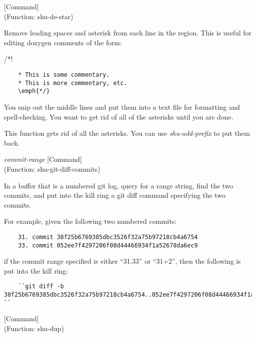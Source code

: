 \vspace{1em}
\noindent
{}
\usebox{\funcname}
 \hfill [Command]\\%
 (Function: shu-de-star)

\begin{doc-string}
Remove leading spaces and asterisk from each line in the region.  This is
useful for editing doxygen comments of the form:

   /*!
\small{\begin{verbatim}
    * This is some commentary.
    * This is more commentary, etc.
    \emph{*/}
\end{verbatim}}

You snip out the middle lines and put them into a text file for formatting and
spell-checking.  You want to get rid of all of the asterisks until you are
done.

This function gets rid of all the asterisks.  You can use \emph{shu-add-prefix} to
put them back.
\end{doc-string}

\vspace{1em}
\noindent
{}
\usebox{\funcname}\emph{commit-range}
 \hfill [Command]\\%
 (Function: shu-git-diff-commits)

\begin{doc-string}
In a buffer that is a numbered git log, query for a range string, find the two
commits, and put into the kill ring a git diff command specifying the two commits.

For example, given the following two numbered commits:

\small{\begin{verbatim}
    31. commit 38f25b6769385dbc3526f32a75b97218cb4a6754
    33. commit 052ee7f4297206f08d44466934f1a52678da6ec9
\end{verbatim}}

if the commit range specified is either ``31.33'' or ``31+2'', then the following
is put into the kill ring:

\small{\begin{verbatim}
    ``git diff -b 38f25b6769385dbc3526f32a75b97218cb4a6754..052ee7f4297206f08d44466934f1a52678da6ec9 ``
\end{verbatim}}
\end{doc-string}

\vspace{1em}
\noindent
{}
\usebox{\funcname}
 \hfill [Command]\\%
 (Function: shu-dup)


